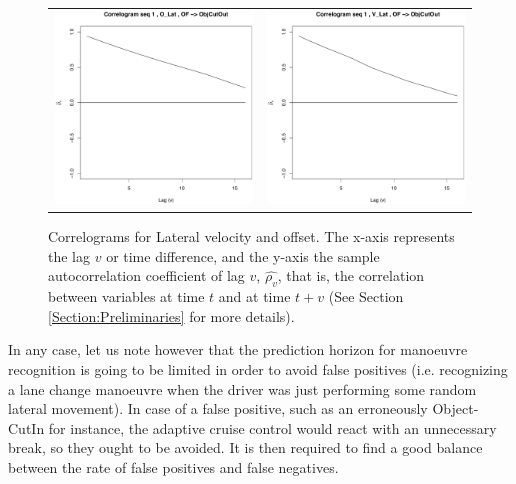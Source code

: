 \begin{figure}
  \centering
    \begin{tabular}{cc}
    \includegraphics[width=60mm]{figures/DaimlerCorrOBJ_R15Offs.pdf}&
    \includegraphics[width=60mm]{figures/DaimlerCorrOBJ_R15Vel.pdf}\\
  \end{tabular}
    \caption{\label{Figure:daimlerCorrel}Correlograms for Lateral velocity and offset. The x-axis represents the lag $v$ or time difference, and the y-axis the sample autocorrelation coefficient of lag $v$, $\hat{\rho_v}$, that is, the correlation between variables at time $t$ and at time $t+v$ (See Section \ref{Section:Preliminaries} for more details).}
\end{figure}

In any case, let us note however that the prediction horizon for manoeuvre recognition is going to be limited in order to avoid false positives (i.e. recognizing a lane change manoeuvre when the driver was just performing some random lateral movement).  In case of a false positive, such as an erroneously Object-CutIn for instance, the adaptive cruise control would react with an unnecessary break, so they ought to be avoided. It is then required to find a good balance between the rate of false positives and false negatives. 

